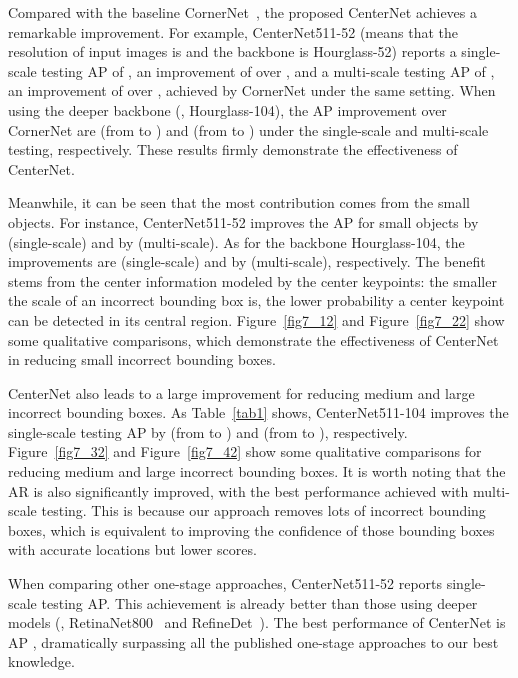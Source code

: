\documentclass[10pt,twocolumn,letterpaper]{article}
\begin{document}
Compared with the baseline CornerNet~\cite{law2018cornernet}, the proposed CenterNet achieves a remarkable improvement. For example, CenterNet511-52 (means that the resolution of input images is  and the backbone is Hourglass-52) reports a single-scale testing AP of , an improvement of  over , and a multi-scale testing AP of , an improvement of  over , achieved by CornerNet under the same setting. When using the deeper backbone (\ie, Hourglass-104), the AP improvement over CornerNet are  (from  to ) and  (from  to ) under the single-scale and multi-scale testing, respectively. These results firmly demonstrate the effectiveness of CenterNet.

Meanwhile, it can be seen that the most contribution comes from the small objects. For instance, CenterNet511-52 improves the AP for small objects by  (single-scale) and by 
 (multi-scale). As for the backbone Hourglass-104, the improvements are  (single-scale) and by  (multi-scale), respectively. The benefit stems from the center information modeled by the center keypoints: the smaller the scale of an incorrect bounding box is, the lower probability a center keypoint can be detected in its central region. Figure~\ref{fig7_12} and Figure~\ref{fig7_22} show some qualitative comparisons, which demonstrate the effectiveness of CenterNet in reducing small incorrect bounding boxes.

CenterNet also leads to a large improvement for reducing medium and large incorrect bounding boxes. As Table~\ref{tab1} shows, CenterNet511-104 improves the single-scale testing AP by  (from  to ) and  (from  to ), respectively. Figure~\ref{fig7_32} and Figure~\ref{fig7_42} show some qualitative comparisons for reducing medium and large incorrect bounding boxes. It is worth noting that the AR is also significantly improved, with the best performance achieved with multi-scale testing. This is because our approach removes lots of incorrect bounding boxes, which is equivalent to improving the confidence of those bounding boxes with accurate locations but lower scores.

When comparing other one-stage approaches, CenterNet511-52 reports  single-scale testing AP. This achievement is already better than those using deeper models (\eg, RetinaNet800~\cite{lin2017focal} and RefineDet~\cite{zhang2018single}). The best performance of CenterNet is AP , dramatically surpassing all the published one-stage approaches to our best knowledge.
\end{document}
